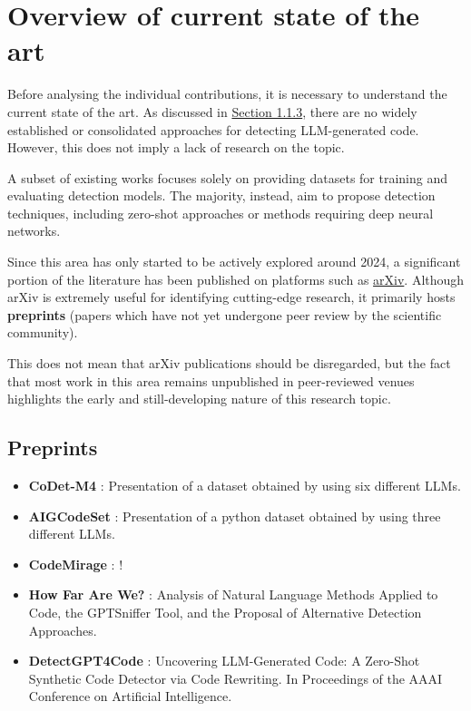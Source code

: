 \clearpage

\chapter{Overview of current state of the art}

Before analysing the individual contributions, 
it is necessary to understand the current state 
of the art. As discussed in
\hyperref[sec:Challenges in LLM-Generated Code Detection]{Section 1.1.3}, 
there are no widely established or consolidated 
approaches for detecting LLM-generated code. However, 
this does not imply a lack of research on the topic. 

A subset of existing works focuses solely on 
providing datasets for training and evaluating 
detection models. The majority, instead, aim to 
propose detection techniques, including zero-shot 
approaches or methods requiring deep neural networks.

Since this area has only started to be actively 
explored around 2024, a significant portion of the 
literature has been published on platforms such as 
\href{https://arxiv.org/abs/2301.11305}{arXiv}. 
Although arXiv is extremely useful for 
identifying cutting-edge research, it primarily hosts 
\textbf{preprints} (papers which have not yet undergone 
peer review by the scientific community).

This does not mean that arXiv publications should 
be disregarded, but the fact that most work in this 
area remains unpublished in peer-reviewed venues 
highlights the early and still-developing nature 
of this research topic.

\section*{Preprints}
\begin{itemize}
  \item \textbf{CoDet-M4} \cite{orel2025codet}: Presentation of a dataset 
  obtained by using six different LLMs.

  \item \textbf{AIGCodeSet} \cite{demirok2024aigcodeset}: Presentation of a python dataset 
  obtained by using three different LLMs.

  \item \textbf{CodeMirage} \cite{guo2025codemirage}: !

  \item \textbf{How Far Are We?} \cite{suh2024empirical}: Analysis of Natural Language Methods 
  Applied to Code, the GPTSniffer Tool, and the Proposal of Alternative Detection Approaches.
  
  \item \textbf{DetectGPT4Code} \cite{yang2023zero}: Uncovering LLM-Generated Code: A Zero-Shot 
  Synthetic Code Detector via Code Rewriting. In Proceedings of the AAAI 
  Conference on Artificial Intelligence.

\end{itemize}



